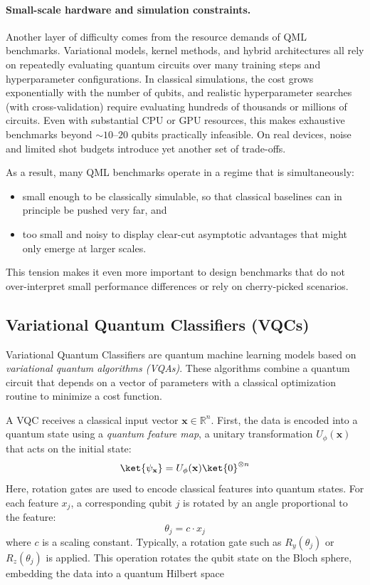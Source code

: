 \paragraph{Small-scale hardware and simulation constraints.}

Another layer of difficulty comes from the resource demands of QML benchmarks. Variational models, kernel methods, and hybrid architectures all rely on repeatedly evaluating quantum circuits over many training steps and hyperparameter configurations. In classical simulations, the cost grows exponentially with the number of qubits, and realistic hyperparameter searches (with cross-validation) require evaluating hundreds of thousands or millions of circuits.\cite{bowles2024better} Even with substantial CPU or GPU resources, this makes exhaustive benchmarks beyond $\sim 10$--$20$ qubits practically infeasible. On real devices, noise and limited shot budgets introduce yet another set of trade-offs.

As a result, many QML benchmarks operate in a regime that is simultaneously:
\begin{itemize}
  \item small enough to be classically simulable, so that classical baselines can in principle be pushed very far, and
  \item too small and noisy to display clear-cut asymptotic advantages that might only emerge at larger scales.
\end{itemize}
This tension makes it even more important to design benchmarks that do not over-interpret small performance differences or rely on cherry-picked scenarios.


\subsection{Variational Quantum Classifiers (VQCs)}
Variational Quantum Classifiers are quantum machine learning models based on \textit{variational quantum algorithms (VQAs)}. These algorithms combine a quantum circuit that depends on a vector of parameters with a classical optimization routine to minimize a cost function.

A VQC receives a classical input vector $\mathbf{x} \in \mathbb{R}^n$. First, the data is encoded into a quantum state using a \textit{quantum feature map}, a unitary transformation $U_\phi(\mathbf{x})$ that acts on the initial state:
\[
\ket{\psi_\mathbf{x}} = U_\phi(\mathbf{x}) \ket{0}^{\otimes n}
\]
Here, rotation gates are used to encode classical features into quantum states. For each feature \( x_j \), a corresponding qubit \( j \) is rotated by an angle proportional to the feature:
\[
\theta_j = c \cdot x_j
\]
where \( c \) is a scaling constant. Typically, a rotation gate such as \( R_y(\theta_j) \) or \( R_z(\theta_j) \) is applied. This operation rotates the qubit state on the Bloch sphere, embedding the data into a quantum Hilbert space

